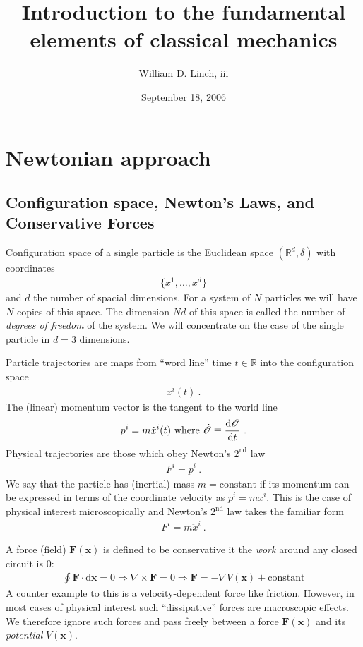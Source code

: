 \documentclass[12pt]{article}
\title{Introduction to the fundamental elements of classical mechanics}
\author{William D. Linch, {\sc iii}}
\date{September 18, 2006}                                           %
\begin{document}
\maketitle


\section{Newtonian approach}

\subsection{Configuration space, Newton's Laws, and Conservative Forces}

Configuration space of a single particle is the Euclidean space $(\mathbb R^d, \delta)$ with coordinates
\begin{eqnarray}
\{x^1, \dots , x^d\}
\end{eqnarray}
and $d$ the number of spacial dimensions. For a system of $N$ particles we will have $N$ copies of this space. The dimension $Nd$ of this space is called the number of {\em degrees of freedom} of the system. We will concentrate on the case of the single particle in $d=3$ dimensions.

Particle trajectories are maps from ``word line'' time $t\in \mathbb R$ into the configuration space
\begin{eqnarray}
x^i(t)~.
\end{eqnarray}
The (linear) momentum vector is the tangent to the world line
\begin{eqnarray}
p^i=m \dot x^i(t)~\mathrm{where}~\dot {\mathscr O}\equiv {\mathrm d \mathscr O \over \mathrm d t}~.
\end{eqnarray}
Physical trajectories are those which obey Newton's $2^\mathrm{nd}$ law
\begin{eqnarray}
F^i=\dot p^i~.
\end{eqnarray}
We say that the particle has (inertial) mass $m=\mathrm{constant}$ if its momentum can be expressed in terms of the coordinate velocity as $p^i=m \dot x^i$. This is the case of physical interest microscopically and Newton's $2^\mathrm{nd}$ law takes the familiar form
\begin{eqnarray}
F^i=m\ddot x^i~.
\end{eqnarray}

A force (field) $\mathbf F(\mathbf x)$ is defined to be conservative it the {\em work} around any closed circuit is 0:
\begin{eqnarray}
\oint \mathbf F \cdot \mathrm d \mathbf x =0\Rightarrow 
\nabla\times \mathbf F=0\Rightarrow 
\mathbf F=-\nabla V(\mathbf x)+\mathrm{constant}
\end{eqnarray}
A counter example to this is a velocity-dependent force like friction. However, in most cases of physical interest such ``dissipative'' forces are macroscopic effects. We therefore ignore such forces and pass freely between a force $\mathbf F(\mathbf x)$ and its {\em potential} $V(\mathbf x)$. 
\end{document}
